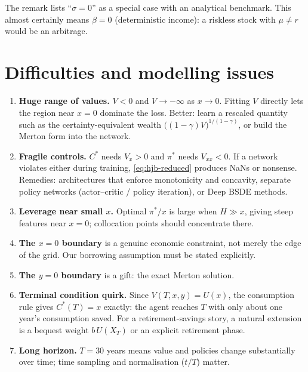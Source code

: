 \documentclass[11pt]{article}
\begin{document}
\begin{caution}
The remark lists ``$\sigma=0$'' as a special case with an analytical benchmark.
This almost certainly means $\beta=0$ (deterministic income): a riskless stock with
$\mu\ne r$ would be an arbitrage.
\end{caution}

\section{Difficulties and modelling issues}\label{sec:difficulties}
\begin{enumerate}
  \item \textbf{Huge range of values.} $V<0$ and $V\to-\infty$ as $x\to0$. Fitting
        $V$ directly lets the region near $x=0$ dominate the loss. Better: learn a
        rescaled quantity such as the certainty-equivalent wealth
        $\big((1-\gamma)V\big)^{1/(1-\gamma)}$, or build the Merton form into the
        network.
  \item \textbf{Fragile controls.} $C^*$ needs $V_x>0$ and $\pi^*$ needs $V_{xx}<0$.
        If a network violates either during training, \eqref{eq:hjb-reduced} produces
        NaNs or nonsense. Remedies: architectures that enforce monotonicity and
        concavity, separate policy networks (actor--critic / policy iteration), or
        Deep BSDE methods.
  \item \textbf{Leverage near small $x$.} Optimal $\pi^*/x$ is large when $H\gg x$,
        giving steep features near $x=0$; collocation points should concentrate there.
  \item \textbf{The $x=0$ boundary} is a genuine economic constraint, not merely the
        edge of the grid. Our borrowing assumption must be stated explicitly.
  \item \textbf{The $y=0$ boundary} is a gift: the exact Merton solution.
  \item \textbf{Terminal condition quirk.} Since $V(T,x,y)=U(x)$, the consumption rule
        gives $C^*(T)=x$ exactly: the agent reaches $T$ with only about one year's
        consumption saved. For a retirement-savings story, a natural extension is a
        bequest weight $b\,U(X_T)$ or an explicit retirement phase.
  \item \textbf{Long horizon.} $T=30$ years means value and policies change
        substantially over time; time sampling and normalisation ($t/T$) matter.
\end{enumerate}
\end{document}

